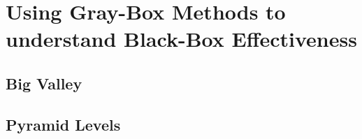 \chapter{Using Gray-Box Methods to understand Black-Box Effectiveness}

\section{Big Valley}

\section{Pyramid Levels}
